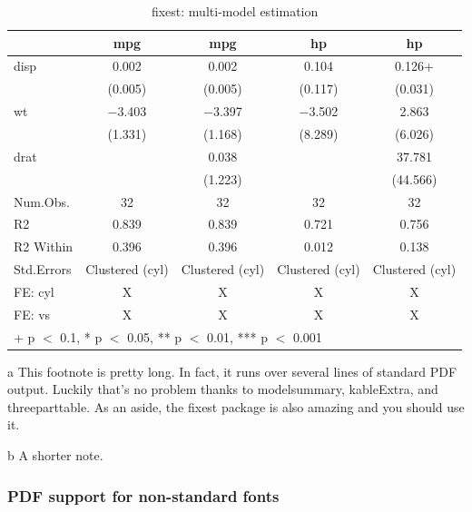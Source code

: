 \documentclass[
]{article}
\begin{document}
\begin{table}[!h]

\begin{threeparttable}
\caption{\label{tab:msummary}fixest: multi-model estimation}
\centering
\begin{tabular}[t]{lcccc}
\toprule
  & mpg & mpg  & hp & hp \\
\midrule
disp & \num{0.002} & \num{0.002} & \num{0.104} & \num{0.126}+\\
 & (\num{0.005}) & (\num{0.005}) & (\num{0.117}) & (\num{0.031})\\
wt & \num{-3.403} & \num{-3.397} & \num{-3.502} & \num{2.863}\\
 & (\num{1.331}) & (\num{1.168}) & (\num{8.289}) & (\num{6.026})\\
drat &  & \num{0.038} &  & \num{37.781}\\
 &  & (\num{1.223}) &  & (\num{44.566})\\
\midrule
Num.Obs. & \num{32} & \num{32} & \num{32} & \num{32}\\
R2 & \num{0.839} & \num{0.839} & \num{0.721} & \num{0.756}\\
R2 Within & \num{0.396} & \num{0.396} & \num{0.012} & \num{0.138}\\
Std.Errors & Clustered (cyl) & Clustered (cyl) & Clustered (cyl) & Clustered (cyl)\\
FE: cyl & X & X & X & X\\
FE: vs & X & X & X & X\\
\bottomrule
\multicolumn{5}{l}{\rule{0pt}{1em}+ p $<$ 0.1, * p $<$ 0.05, ** p $<$ 0.01, *** p $<$ 0.001}\\
\end{tabular}
\begin{tablenotes}
\small
\item [a] This footnote is pretty long. In fact, it runs over several lines of standard PDF output. Luckily that's no problem thanks to modelsummary, kableExtra, and threeparttable. As an aside, the fixest package is also amazing and you should use it.
\item [b] A shorter note.
\end{tablenotes}
\end{threeparttable}
\end{table}

\hypertarget{pdf-support-for-non-standard-fonts}{%
\subsubsection{PDF support for non-standard
fonts}\label{pdf-support-for-non-standard-fonts}}
\end{document}
